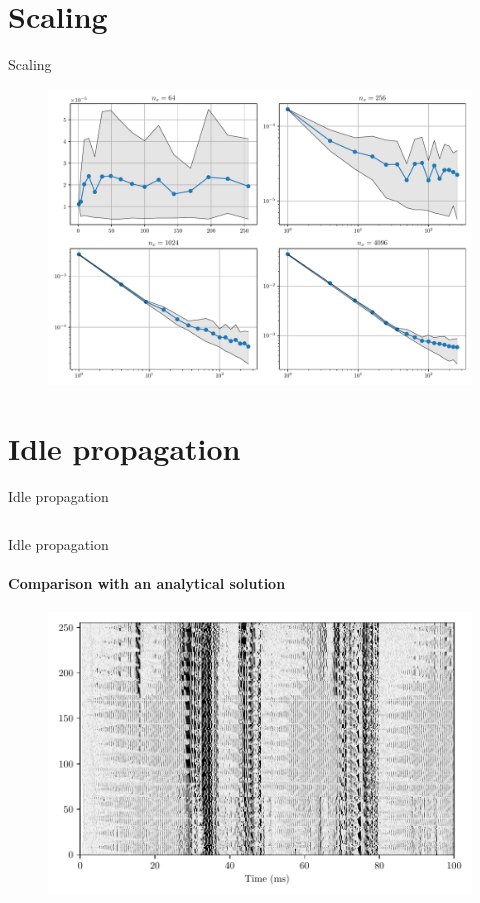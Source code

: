 \documentclass[aspectratio=169]{beamer}
\begin{document}
\section{Scaling}
\begin{frame}{Scaling}
    \begin{figure}
        \centering
        \includegraphics[width=0.75\linewidth]{Figures/strong_scaling.pdf}
    \end{figure}
\end{frame}


\section{Idle propagation}
\begin{frame}{Idle propagation}
    \inputminted[tabsize=4,fontsize=\scriptsize,framesep=2mm,bgcolor=codebgcolor,breaklines,linenos]{c}{../core2.c}    
\end{frame}

\begin{frame}{Idle propagation}
    \framesubtitle{Comparison with an analytical solution}
    \begin{figure}
        \centering
        \includegraphics[width=0.8\linewidth]{Figures/idle_propagation.pdf}
    \end{figure}
\end{frame}
\end{document}
